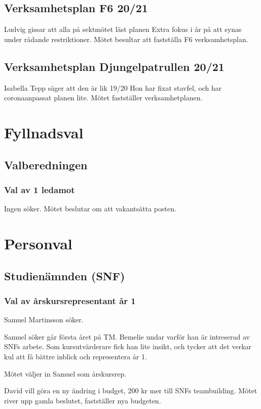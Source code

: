 \documentclass[hidelinks]{../sektionsmote} %
\begin{document}
\subsection{Verksamhetsplan F6 20/21}
Ludvig gissar att alla på sektmötet läst planen
Extra fokus i år på att synas under rådande restriktioner.
Mötet besultar att fastställa F6 verksamhetsplan.

\subsection{Verksamhetsplan Djungelpatrullen 20/21}
Isabella Tepp säger att den är lik 19/20
Hon har fixat stavfel, och har coronaanpassat planen lite.
Mötet fastställer verksamhetplanen.


\section{Fyllnadsval}

\subsection{Valberedningen}

\subsubsection{Val av 1 ledamot}
Ingen söker.
Mötet beslutar om att vakantsätta posten.


\section{Personval}

\subsection{Studienämnden (SNF)}

\subsubsection{Val av årskursrepresentant år 1}
Samuel Martinsson söker.

Samuel söker går första året på TM.
Bemelie undar varför han är intreserad av SNFs arbete.
Som kursutvärderare fick han lite insikt, och tycker att det verkar kul att få bättre inblick och representera år 1.

Mötet väljer in Samuel som årskursrep.

\begin{ofraga} \label{uppriven-budget}
    David vill göra en ny ändring i budget, 200 kr mer till SNFs teambuilding.
    Mötet river upp gamla beslutet, fastställer nya budgeten.
\end{ofraga}
\end{document}
